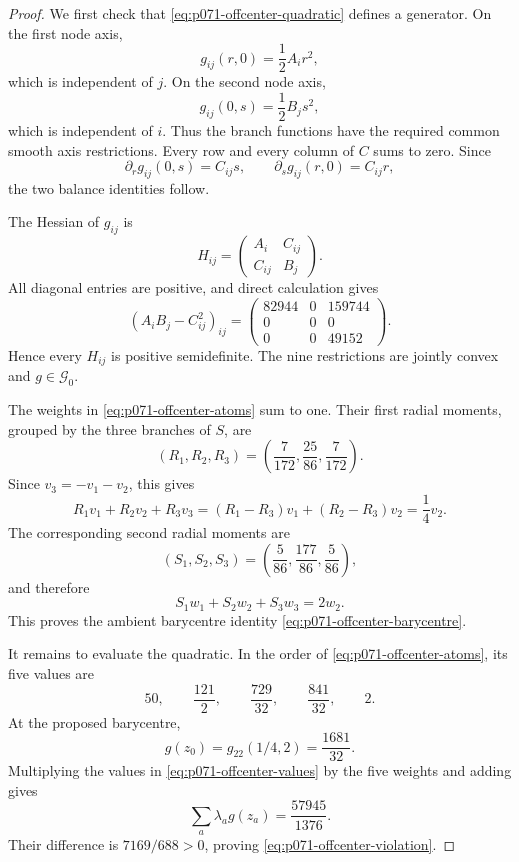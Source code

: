 \begin{proof}
We first check that \eqref{eq:p071-offcenter-quadratic} defines a generator.
On the first node axis,
\[
                         g_{ij}(r,0)=\frac12A_ir^2,
\]
which is independent of $j$.  On the second node axis,
\[
                         g_{ij}(0,s)=\frac12B_js^2,
\]
which is independent of $i$.  Thus the branch functions have the required
common smooth axis restrictions.  Every row and every column of $C$ sums
to zero.  Since
\[
 \partial_rg_{ij}(0,s)=C_{ij}s,
 \qquad
 \partial_sg_{ij}(r,0)=C_{ij}r,
\]
the two balance identities follow.

The Hessian of $g_{ij}$ is
\[
 H_{ij}=\begin{pmatrix}A_i&C_{ij}\\ C_{ij}&B_j\end{pmatrix}.
\]
All diagonal entries are positive, and direct calculation gives
\begin{equation}
 (A_iB_j-C_{ij}^2)_{ij}
 =\begin{pmatrix}
 82944&0&159744\\
 0&0&0\\
 0&0&49152
 \end{pmatrix}.
 \label{eq:p071-offcenter-determinants}
\end{equation}
Hence every $H_{ij}$ is positive semidefinite.  The nine restrictions are
jointly convex and $g\in\mathcal G_0$.

The weights in \eqref{eq:p071-offcenter-atoms} sum to one.  Their first
radial moments, grouped by the three branches of $S$, are
\begin{equation}
 (R_1,R_2,R_3)=
 \left(\frac7{172},\frac{25}{86},\frac7{172}\right).
 \label{eq:p071-offcenter-first-moments}
\end{equation}
Since $v_3=-v_1-v_2$, this gives
\[
 R_1v_1+R_2v_2+R_3v_3
  =(R_1-R_3)v_1+(R_2-R_3)v_2
  =\frac14v_2.
\]
The corresponding second radial moments are
\begin{equation}
 (S_1,S_2,S_3)=
 \left(\frac5{86},\frac{177}{86},\frac5{86}\right),
 \label{eq:p071-offcenter-second-moments}
\end{equation}
and therefore
\[
 S_1w_1+S_2w_2+S_3w_3=2w_2.
\]
This proves the ambient barycentre identity
\eqref{eq:p071-offcenter-barycentre}.

It remains to evaluate the quadratic.  In the order of
\eqref{eq:p071-offcenter-atoms}, its five values are
\begin{equation}
             50,\qquad \frac{121}{2},\qquad
             \frac{729}{32},\qquad \frac{841}{32},\qquad 2.
 \label{eq:p071-offcenter-values}
\end{equation}
At the proposed barycentre,
\[
 g(z_0)=g_{22}(1/4,2)=\frac{1681}{32}.
\]
Multiplying the values in \eqref{eq:p071-offcenter-values} by the five
weights and adding gives
\[
 \sum_a\lambda_ag(z_a)=\frac{57945}{1376}.
\]
Their difference is $7169/688>0$, proving
\eqref{eq:p071-offcenter-violation}.


\end{proof}

